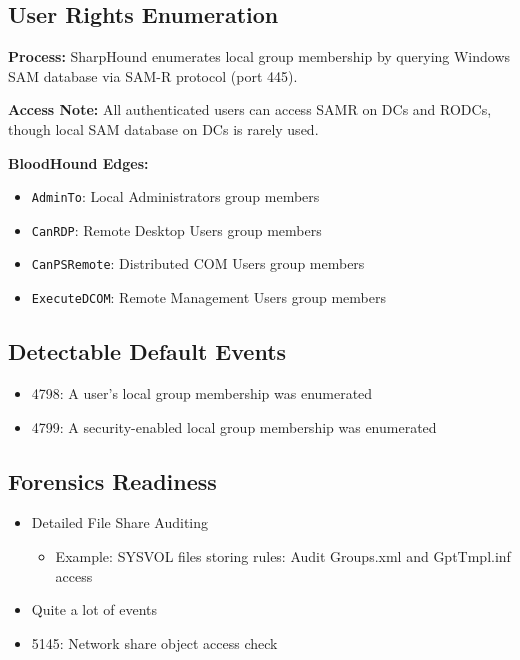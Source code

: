 \subsection*{User Rights Enumeration}

\textbf{Process:} SharpHound enumerates local group membership by querying Windows SAM database via SAM-R protocol (port 445).

\textbf{Access Note:} All authenticated users can access SAMR on DCs and RODCs, though local SAM database on DCs is rarely used.

\textbf{BloodHound Edges:}
\begin{itemize}
    \item \texttt{AdminTo}: Local Administrators group members
    \item \texttt{CanRDP}: Remote Desktop Users group members  
    \item \texttt{CanPSRemote}: Distributed COM Users group members
    \item \texttt{ExecuteDCOM}: Remote Management Users group members
\end{itemize}

\subsection*{Detectable Default Events}
\begin{itemize}
    \item 4798: A user's local group membership was enumerated
    \item 4799: A security-enabled local group membership was enumerated
\end{itemize}

\subsection*{Forensics Readiness}
\begin{itemize}
    \item Detailed File Share Auditing
    \begin{itemize}
        \item Example: SYSVOL files storing rules: Audit Groups.xml and GptTmpl.inf access
    \end{itemize}
    \item Quite a lot of events
    \item 5145: Network share object access check
\end{itemize}

